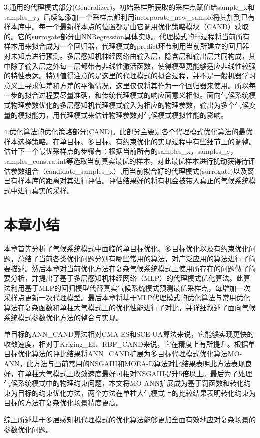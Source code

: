 3.通用的代理模式部分(Generalizer)。初始采样所获取的采样点赋值给sample\_x和samples\_y，后续每添加一个采样点都利用incorporate\_new\_sample将其加到已有样本库中。每一个最新样本点的位置都是由它调用优化策略模块（CAND）获取的。它的surrogate部分由NNRegression具体实现。代理模式的fit过程将当前所有样本用来拟合成为一个回归器，代理模式的predict环节利用当前所建立的回归器对未知点进行预测。多层感知机神经网络由输入层，隐含层和输出层共同构成，其中除了输入层之外每一层都带有非线性激活函数，使得模型更能够适应非线性较强的特性表达。特别值得注意的是这里的代理模式的拟合过程，并不是一般机器学习意义上寻求偏差和方差的平衡情况，这里仅仅将其作为一个回归器来使用。所以每一步的拟合过程要尽量准确，和传统代理模式的响应面意义相似。面向气候系统模式物理参数优化的多层感知机代理模式输入为相应的物理参数，输出为多个气候变量的模拟能力，用代理模式来估计物理参数对气候模式模拟性能的影响。

4.优化算法的优化策略部分(CAND)。此部分主要是各个代理模式优化算法的最优样本选择策略。在单目标、多目标、有约束优化的实现过程中有些细节上的调整。估计下一个最优采样点的步骤有：根据当前所有的samples\_x，samples\_y，
samples\_constratint等选取当前真实最优的样本，对此最优样本进行扰动获得待评估参数组合（candidate\_samples\_x）,用当前拟合好的代理模式(surrogate)以及离已有样本库的距离对其进行评估。评估结果好的将有机会被带入真正的气候系统模式中进行真实的采样。
   
\section{本章小结}
本章首先分析了气候系统模式中面临的单目标优化、多目标优化以及有约束优化问题，总结了当前各类优化问题分别有哪些常用的算法，对广泛应用的算法进行了简要描述。然后本章对当前优化方法在复杂气候系统模式上使用所存在的问题做了简要分析，并提出了基于多层感知机神经网络（MLP）的代理模式优化算法。此算法利用基于MLP的回归模型代替真实气候系统模式预测最优采样点，每增加一次采样点更新一次代理模型。最后本章将基于MLP代理模式的优化算法与常用优化算法在复杂函数和单柱大气模式上的优化性能进行了对比，并详细叙述了面向气候系统模式参数优化方法的整合与实现。

单目标的ANN\_CAND算法相对CMA-ES和SCE-UA算法来说，它能够实现更快的收敛速度，相对于Kriging\_EI、RBF\_CAND来说，它在精度上有所提升。根据单目标优化算法的评比结果将ANN\_CAND扩展为多目标代理模式优化算法MO-ANN，此方法与当前常用的NSGAIII和MOEA-D算法对比结果表明此方法表现良好，在单柱大气模式上收敛速度最好可相对NSGAIII提升5倍以上。最后为了处理气候系统模式中的物理约束问题，本文将MO-ANN扩展成为基于罚函数和转化约束为目标的约束优化方法，两个方法在单柱大气模式上的比较结果表明转化约束为目标的方法在复杂优化场景精度更高。

综上所述基于多层感知机代理模式的优化算法能够更加全面有效地应对复杂场景的参数优化问题。


